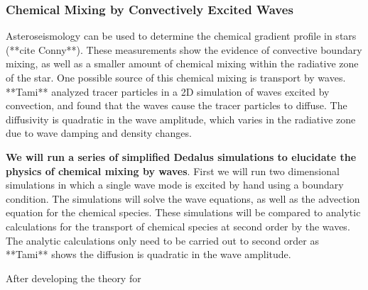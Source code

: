 {\color{purple}
\subsubsection{Chemical Mixing by Convectively Excited Waves}
}

Asteroseismology can be used to determine the chemical gradient profile in stars (**cite Conny**). These measurements show the evidence of convective boundary mixing, as well as a smaller amount of chemical mixing within the radiative zone of the star. One possible source of this chemical mixing is transport by waves. **Tami** analyzed tracer particles in a 2D simulation of waves excited by convection, and found that the waves cause the tracer particles to diffuse. The diffusivity is quadratic in the wave amplitude, which varies in the radiative zone due to wave damping and density changes.

\textbf{We will run a series of simplified Dedalus simulations to elucidate the physics of chemical mixing by waves}. First we will run two dimensional simulations in which a single wave mode is excited by hand using a boundary condition. The simulations will solve the wave equations, as well as the advection equation for the chemical species. These simulations will be compared to analytic calculations for the transport of chemical species at second order by the waves. The analytic calculations only need to be carried out to second order as **Tami** shows the diffusion is quadratic in the wave amplitude.

After developing the theory for 

